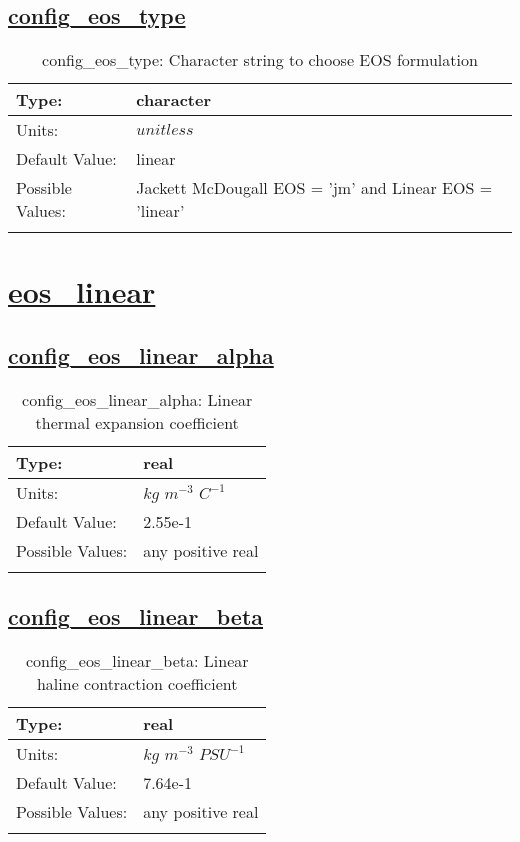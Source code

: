 \subsection[config\_eos\_type]{\hyperref[sec:nm_tab_eos]{config\_eos\_type}}
\label{subsec:nm_sec_config_eos_type}
\begin{center}
\begin{longtable}{| p{2.0in} | p{4.0in} |}
    \hline
    Type: & character \\
    \hline
    Units: & $unitless$ \\
    \hline
    Default Value: & linear \\
    \hline
    Possible Values: & Jackett McDougall EOS = 'jm' and Linear EOS = 'linear' \\
    \hline
    \caption{config\_eos\_type: Character string to choose EOS formulation}
\end{longtable}
\end{center}
\section[eos\_linear]{\hyperref[sec:nm_tab_eos_linear]{eos\_linear}}
\label{sec:nm_sec_eos_linear}
\subsection[config\_eos\_linear\_alpha]{\hyperref[sec:nm_tab_eos_linear]{config\_eos\_linear\_alpha}}
\label{subsec:nm_sec_config_eos_linear_alpha}
\begin{center}
\begin{longtable}{| p{2.0in} | p{4.0in} |}
    \hline
    Type: & real \\
    \hline
    Units: & $kg$ $m^{-3}$ $C^{-1}$ \\
    \hline
    Default Value: & 2.55e-1 \\
    \hline
    Possible Values: & any positive real \\
    \hline
    \caption{config\_eos\_linear\_alpha: Linear thermal expansion coefficient}
\end{longtable}
\end{center}
\subsection[config\_eos\_linear\_beta]{\hyperref[sec:nm_tab_eos_linear]{config\_eos\_linear\_beta}}
\label{subsec:nm_sec_config_eos_linear_beta}
\begin{center}
\begin{longtable}{| p{2.0in} | p{4.0in} |}
    \hline
    Type: & real \\
    \hline
    Units: & $kg$ $m^{-3}$ $PSU^{-1}$ \\
    \hline
    Default Value: & 7.64e-1 \\
    \hline
    Possible Values: & any positive real \\
    \hline
    \caption{config\_eos\_linear\_beta: Linear haline contraction coefficient}
\end{longtable}
\end{center}
